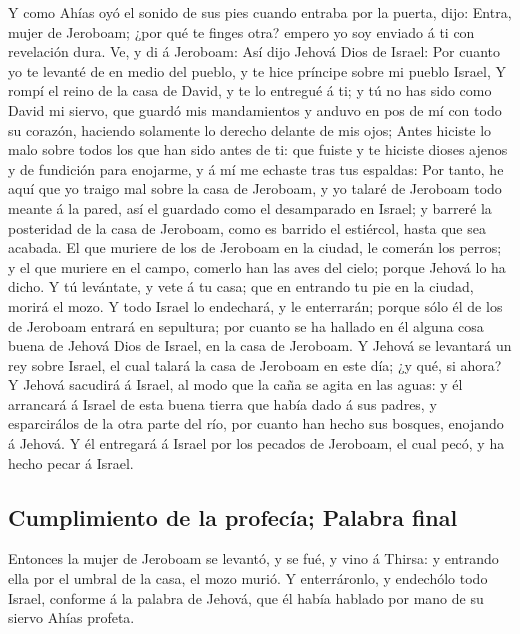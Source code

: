  Y como Ahías oyó el sonido de sus pies cuando entraba por
la puerta, dijo: Entra, mujer de Jeroboam; ¿por qué te finges otra?
empero yo soy enviado á ti con revelación dura.  Ve, y di á
Jeroboam: Así dijo Jehová Dios de Israel: Por cuanto yo te levanté de en
medio del pueblo, y te hice príncipe sobre mi pueblo Israel,
 Y rompí el reino de la casa de David, y te lo entregué á
ti; y tú no has sido como David mi siervo, que guardó mis mandamientos y
anduvo en pos de mí con todo su corazón, haciendo solamente lo derecho
delante de mis ojos;  Antes hiciste lo malo sobre todos los
que han sido antes de ti: que fuiste y te hiciste dioses ajenos y de
fundición para enojarme, y á mí me echaste tras tus espaldas:
 Por tanto, he aquí que yo traigo mal sobre la casa de
Jeroboam, y yo talaré de Jeroboam todo meante á la pared, así el
guardado como el desamparado en Israel; y barreré la posteridad de la
casa de Jeroboam, como es barrido el estiércol, hasta que sea acabada.
 El que muriere de los de Jeroboam en la ciudad, le comerán
los perros; y el que muriere en el campo, comerlo han las aves del
cielo; porque Jehová lo ha dicho.  Y tú levántate, y vete á
tu casa; que en entrando tu pie en la ciudad, morirá el mozo.
 Y todo Israel lo endechará, y le enterrarán; porque sólo
él de los de Jeroboam entrará en sepultura; por cuanto se ha hallado en
él alguna cosa buena de Jehová Dios de Israel, en la casa de Jeroboam.
 Y Jehová se levantará un rey sobre Israel, el cual talará
la casa de Jeroboam en este día; ¿y qué, si ahora?  Y
Jehová sacudirá á Israel, al modo que la caña se agita en las aguas: y
él arrancará á Israel de esta buena tierra que había dado á sus padres,
y esparcirálos de la otra parte del río, por cuanto han hecho sus
bosques, enojando á Jehová.  Y él entregará á Israel por
los pecados de Jeroboam, el cual pecó, y ha hecho pecar á Israel.

\hypertarget{cumplimiento-de-la-profecuxeda-palabra-final}{%
\subsection{Cumplimiento de la profecía; Palabra
final}\label{cumplimiento-de-la-profecuxeda-palabra-final}}

 Entonces la mujer de Jeroboam se levantó, y se fué, y vino
á Thirsa: y entrando ella por el umbral de la casa, el mozo murió.
 Y enterráronlo, y endechólo todo Israel, conforme á la
palabra de Jehová, que él había hablado por mano de su siervo Ahías
profeta.

